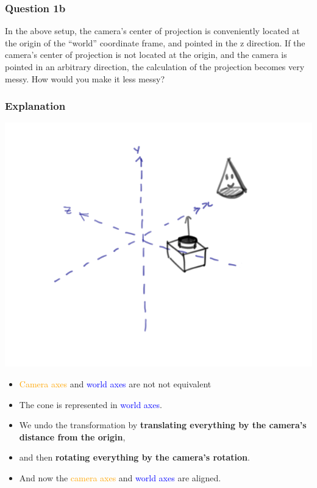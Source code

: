 \documentclass{beamer}
\begin{document}
\begin{frame}
    \frametitle{Question 1b}
    In the above setup, the camera's center of projection is conveniently located at the origin of the “world” coordinate frame, 
    and pointed in the z direction. If the camera's center of projection is not located at the origin, and the camera is pointed in an 
    arbitrary direction, the calculation of the projection becomes very messy. How would you make it less messy?
\end{frame}

\begin{frame}
    \frametitle{Explanation}

    \begin{center}
        \includegraphics[]{q1b-orig.png}
    \end{center}

    \small
    \begin{itemize}
        \item \textcolor{orange}{Camera axes} and \textcolor{blue}{world axes} are not not equivalent
        \item The cone is represented in \textcolor{blue}{world axes}.
        \item We undo the transformation by \textbf{translating everything by the camera's distance from the origin},
        \item and then \textbf{rotating everything by the camera's rotation}.
        \item And now the \textcolor{orange}{camera axes} and \textcolor{blue}{world axes} are aligned.
    \end{itemize}

\end{frame}
\end{document}
